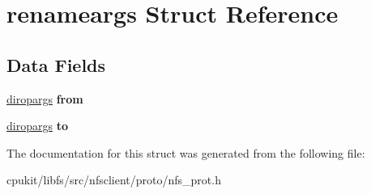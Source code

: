 \hypertarget{structrenameargs}{}\section{renameargs Struct Reference}
\label{structrenameargs}
\subsection*{Data Fields}
\begin{DoxyCompactItemize}
\item 
\mbox{\label{structrenameargs_a3b7062b92d3f5a0974c5087894ed6fa1}} 
\mbox{\hyperlink{structdiropargs}{diropargs}} {\bfseries from}
\item 
\mbox{\label{structrenameargs_a3bd2deebff4a99f5c589218e2f057bb0}} 
\mbox{\hyperlink{structdiropargs}{diropargs}} {\bfseries to}
\end{DoxyCompactItemize}


The documentation for this struct was generated from the following file\+:\begin{DoxyCompactItemize}
\item 
cpukit/libfs/src/nfsclient/proto/nfs\+\_\+prot.\+h\end{DoxyCompactItemize}
